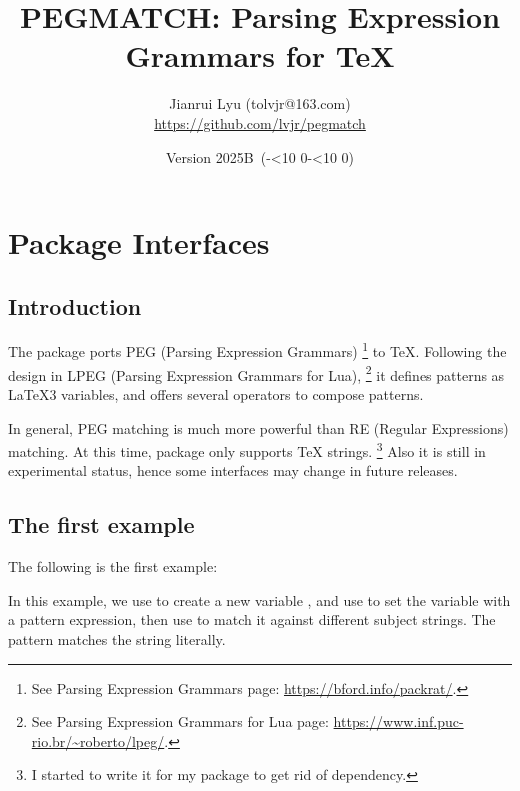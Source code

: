 \documentclass[oneside]{book}
\newcommand*{\myversion}{2025B}
\newcommand*{\mydate}{Version \myversion\ (\the\year-\mylpad\month-\mylpad\day)}
\newcommand*{\mylpad}[1]{\ifnum#1<10 0\the#1\else\the#1\fi}
\begin{document}
\title{\textsf{\color{green3}PEGMATCH: Parsing Expression Grammars for TeX}}
\author{Jianrui Lyu (tolvjr@163.com)\\ \url{https://github.com/lvjr/pegmatch}}
\date{\mydate}
\maketitle

\tableofcontents

\chapter{Package Interfaces}

\section{Introduction}

The  package ports PEG (Parsing Expression Grammars)%
\footnote{See Parsing Expression Grammars page: \url{https://bford.info/packrat/}.} to TeX.
Following the design in LPEG (Parsing Expression Grammars for Lua),%
\footnote{See Parsing Expression Grammars for Lua page: \url{https://www.inf.puc-rio.br/~roberto/lpeg/}.}
it defines patterns as LaTeX3 variables, and offers several operators to compose patterns.

In general, PEG matching is much more powerful than RE (Regular Expressions) matching.
At this time,  package only supports TeX strings.%
\footnote{I started to write it for my  package to get rid of  dependency.}
Also it is still in experimental status, hence some interfaces may change in future releases.

\section{The first example}

The following is the first example:
\begin{demohigh}
\NewSpeg\lMyTestSpeg
\SetSpeg{}
\IfSpegMatchTF{}
\IfSpegMatchTF{}
\IfSpegMatchTF{}
\IfSpegMatchTF{}
\end{demohigh}
In this example, we use \CC{\NewSpeg} to create a new  variable \VV{\lMyTestSpeg},
and use \CC{\SetSpeg} to set the variable with a pattern expression,
then use \CC{\IfSpegMatchTF} to match it against different subject strings.
The pattern  matches the string  literally.
\end{document}
